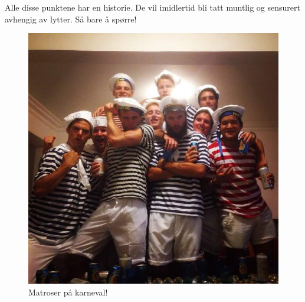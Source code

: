 Alle disse punktene har en historie. De vil imidlertid bli tatt
muntlig og sensurert avhengig av lytter. Så bare å spørre!

\begin{figure}[H]
	\centering
	\includegraphics[width=\textwidth]{matroser}
	\caption*{Matroser på karneval!}
	\label{fig:karneval}
\end{figure}
